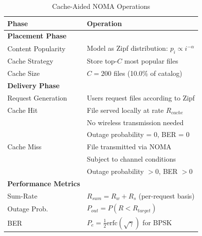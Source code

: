 \documentclass{article}
\begin{document}
\begin{table}[h]
\centering
\caption{Cache-Aided NOMA Operations}
\label{tab:cache_ops}
\begin{tabular}{|l|p{8cm}|}
\hline
\textbf{Phase} & \textbf{Operation} \\
\hline
\textbf{Placement Phase} & \\
Content Popularity & Model as Zipf distribution: $p_i \propto i^{-\alpha}$ \\
Cache Strategy & Store top-$C$ most popular files \\
Cache Size & $C = 200$ files (10.0\% of catalog) \\
\hline
\textbf{Delivery Phase} & \\
Request Generation & Users request files according to Zipf \\
Cache Hit & File served locally at rate $R_{cache}$ \\
            & No wireless transmission needed \\
            & Outage probability = 0, BER = 0 \\
\hline
Cache Miss & File transmitted via NOMA \\
           & Subject to channel conditions \\
           & Outage probability $> 0$, BER $> 0$ \\
\hline
\textbf{Performance Metrics} & \\
Sum-Rate & $R_{sum} = R_w + R_s$ (per-request basis) \\
Outage Prob. & $P_{out} = P(R < R_{target})$ \\
BER & $P_e = \frac{1}{2}\text{erfc}(\sqrt{\gamma})$ for BPSK \\
\hline
\end{tabular}
\end{table}
\end{document}
